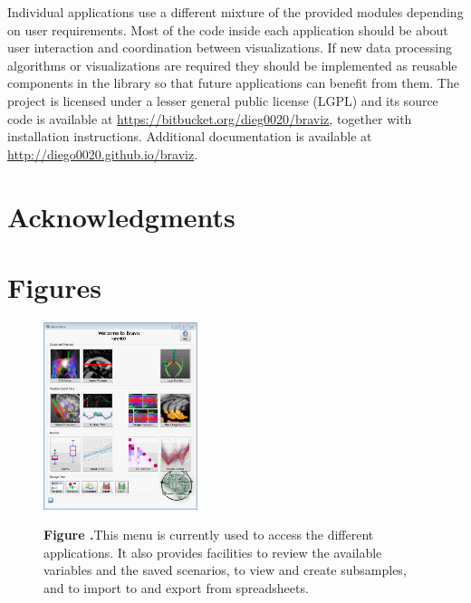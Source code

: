 \documentclass[utf8,paper]{frontiersSCNS} %
\begin{document}
Individual applications use a different mixture of the provided modules depending on user requirements. Most of the code inside each application should be about user interaction and coordination between visualizations. If new data processing algorithms or visualizations are required they should be implemented as reusable components in the library so that future applications can benefit from them. The project is licensed under a lesser general public license (LGPL) and its source code is available at \url{https://bitbucket.org/dieg0020/braviz}, together with installation instructions. Additional documentation is available at \url{http://diego0020.github.io/braviz}.

\section*{Acknowledgments}

\section*{Figures}

\begin{figure}[h!]
\begin{center}
\includegraphics[width=0.4\textwidth]{figures/braviz_menu.PNG}
\end{center}
 \textbf{\label{fig_menu} Figure .}{This menu is currently used to access the different applications. It also provides facilities to review the available variables and the saved scenarios, to view and create subsamples, and to import to and export from spreadsheets.  }
\end{figure}
\end{document}

